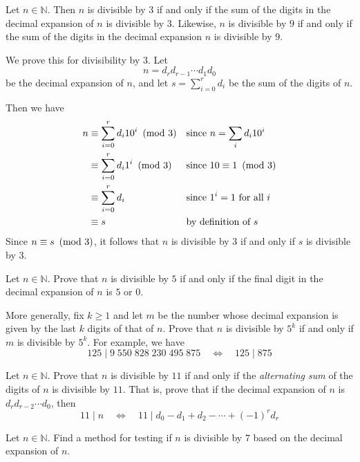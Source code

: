 \begin{example}
Let $n \in \mathbb{N}$. Then $n$ is divisible by $3$ if and only if the sum of the digits in the decimal expansion of $n$ is divisible by $3$. Likewise, $n$ is divisible by $9$ if and only if the sum of the digits in the decimal expansion $n$ is divisible by $9$.

We prove this for divisibility by $3$. Let
\[ n = d_r d_{r-1} \cdots d_1 d_0 \]
be the decimal expansion of $n$, and let $s = \sum_{i=0}^r d_i$ be the sum of the digits of $n$.

Then we have
\begin{align*}
n &\equiv \sum_{i=0}^r d_i 10^i \cmod{3} && \text{since $n=\sum_i d_i 10^i$} \\
&\equiv \sum_{i=0}^r d_i 1^i \cmod{3} && \text{since $10 \equiv 1 \cmod{3}$} \\
&\equiv \sum_{i=0}^r d_i && \text{since $1^i=1$ for all $i$} \\
&\equiv s && \text{by definition of $s$}
\end{align*}
Since $n \equiv s ~\left(\text{mod}~3\right)$, it follows that $n$ is divisible by $3$ if and only if $s$ is divisible by $3$.
\end{example}

\begin{exercise}
Let $n \in \mathbb{N}$. Prove that $n$ is divisible by $5$ if and only if the final digit in the decimal expansion of $n$ is $5$ or $0$.

More generally, fix $k \ge 1$ and let $m$ be the number whose decimal expansion is given by the last $k$ digits of that of $n$. Prove that $n$ is divisible by $5^k$ if and only if $m$ is divisible by $5^k$. For example, we have
\[ 125 \mid 9\;550\;828\;230\;495\;875 \quad \Leftrightarrow \quad 125 \mid 875 \]
\end{exercise}

\begin{exercise}
Let $n \in \mathbb{N}$. Prove that $n$ is divisible by $11$ if and only if the \textit{alternating sum} of the digits of $n$ is divisible by $11$. That is, prove that if the decimal expansion of $n$ is $d_rd_{r-2} \cdots d_0$, then
\[ 11 \mid n \quad \Leftrightarrow \quad 11 \mid d_0 - d_1 + d_2 - \cdots + (-1)^rd_r \]
\end{exercise}

\begin{exercise}
Let $n \in \mathbb{N}$. Find a method for testing if $n$ is divisible by $7$ based on the decimal expansion of $n$.
\end{exercise}

